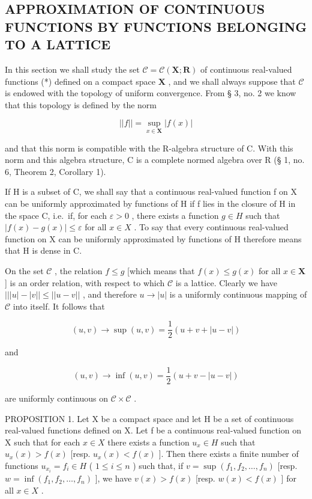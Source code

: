 \subsection{APPROXIMATION OF CONTINUOUS FUNCTIONS BY FUNCTIONS BELONGING TO A LATTICE}

In this section we shall study the set \(\mathcal{C} = \mathcal{C}(\mathbf{X};\mathbf{R})\) of continuous real-valued functions (*) defined on a compact space \(\mathbf{X}\) , and we shall always suppose that \(\mathcal{C}\) is endowed with the topology of uniform convergence. From § 3, no. 2 we know that this topology is defined by the norm

\[
| | f | | = \sup _ {x \in \mathbf {X}} | f (x) |
\]

and that this norm is compatible with the R-algebra structure of C. With this norm and this algebra structure, C is a complete normed algebra over R (§ 1, no. 6, Theorem 2, Corollary 1).

If H is a subset of C, we shall say that a continuous real-valued function f on X can be uniformly approximated by functions of H if f lies in the closure of H in the space C, i.e.~if, for each \(\varepsilon > 0\) , there exists a function \(g \in H\) such that \(|f(x) - g(x)| \leqslant \varepsilon\) for all \(x \in X\) . To say that every continuous real-valued function on X can be uniformly approximated by functions of H therefore means that H is dense in C.

On the set \(\mathcal{C}\) , the relation \(f \leqslant g\) {[}which means that \(f(x) \leqslant g(x)\) for all \(x \in \mathbf{X}\) {]} is an order relation, with respect to which \(\mathcal{C}\) is a lattice. Clearly we have \(|||u| - |v|| \leqslant ||u - v||\) , and therefore \(u \to |u|\) is a uniformly continuous mapping of \(\mathcal{C}\) into itself. It follows that

\[
(u, v) \rightarrow \sup (u, v) = \frac {1}{2} (u + v + | u - v |)
\]

and

\[
(u, v) \rightarrow \inf (u, v) = \frac {1}{2} (u + v - | u - v |)
\]

are uniformly continuous on \(\mathcal{C} \times \mathcal{C}\) .

PROPOSITION 1. Let X be a compact space and let H be a set of continuous real-valued functions defined on X. Let f be a continuous real-valued function on X such that for each \(x \in X\) there exists a function \(u_x \in H\) such that \(u_x(x) > f(x)\) {[}resp. \(u_x(x) < f(x)\) {]}. Then there exists a finite number of functions \(u_{x_i} = f_i \in H\) ( \(1 \leqslant i \leqslant n\) ) such that, if \(v = \sup(f_1, f_2, \ldots, f_n)\) {[}resp. \(w = \inf(f_1, f_2, \ldots, f_n)\) {]}, we have \(v(x) > f(x)\) {[}resp. \(w(x) < f(x)\) {]} for all \(x \in X\) .


